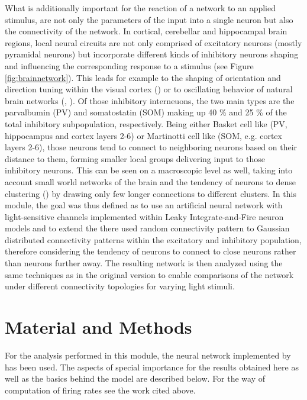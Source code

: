\documentclass[14pt]{SelfArx} %
\numberwithin{equation}{section}
\begin{document}
\newline
What is additionally important for the reaction of a network to an applied stimulus, are not only the parameters of the input into a single neuron but also the connectivity of the network. In cortical, cerebellar and hippocampal brain regions, local neural circuits are not only comprised of excitatory neurons (mostly pyramidal neurons) but incorporate different kinds of inhibitory neurons shaping and influencing the corresponding response to a stimulus (see Figure \ref{fig:brainnetwork}). This leads for example to the shaping of orientation and direction tuning within the visual cortex (\cite{Crook}) or to oscillating behavior of natural brain networks (\cite{salinas}, \cite{engel}).\newline
Of those inhibitory interneuons, the two main types are the parvalbumin (PV) and somatostatin (SOM) making up 40 \% and 25 \% of the total inhibitory subpopulation, respectively. Being either Basket cell like (PV, hippocampus and cortex layers 2-6) or Martinotti cell like (SOM, e.g. cortex layers 2-6), those neurons tend to connect to neighboring neurons based on their distance to them, forming smaller local groups delivering input to those inhibitory neurons. This can be seen on a macroscopic level as well, taking into account small world networks of the brain and the tendency of neurons to dense clustering (\cite{Bassett}) by drawing only few longer connections to different clusters.\newline
\newline
In this module, the goal was thus defined as to use an artificial neural network with light-sensitive channels implemented within Leaky Integrate-and-Fire neuron models and to extend the there used random connectivity pattern to Gaussian distributed connectivity patterns within the excitatory and inhibitory population, therefore considering the tendency of neurons to connect to close neurons rather than neurons further away. The resulting network is then analyzed using the same techniques as in the original version to enable comparisons of the network under different connectivity topologies for varying light stimuli.
\section{Material and Methods}
For the analysis performed in this module, the neural network implemented by \cite{jannik} has been used. \newline
The aspects of special importance for the results obtained here as well as the basics behind the model are described below. \newline
For the way of computation of firing rates see the work cited above.
\end{document}
